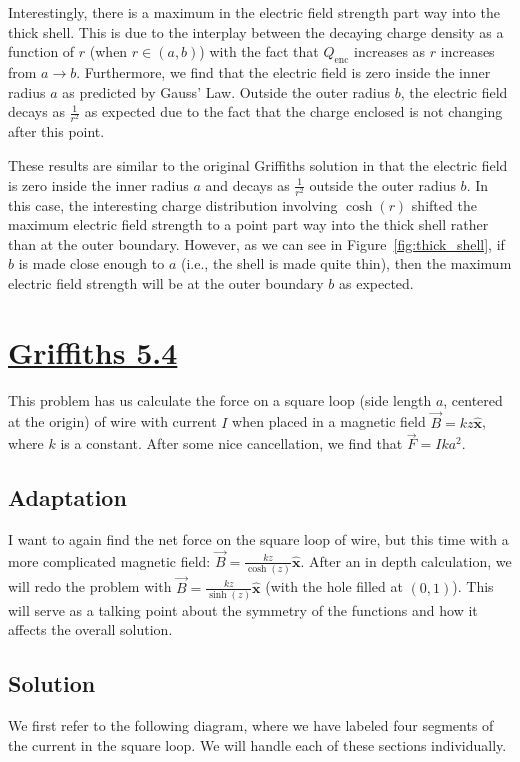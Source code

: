 \documentclass{article}
\newcommand{\xhat}{\hat{\textbf{x}}}
\begin{document}
Interestingly, there is a maximum in the electric field strength part way into the thick shell. This is due to the interplay between the decaying charge density as a function of $r$ (when $r\in(a,b)$) with the fact that $Q_\textrm{enc}$ increases as $r$ increases from $a\to b$. Furthermore, we find that the electric field is zero inside the inner radius $a$ as predicted by Gauss' Law. Outside the outer radius $b$, the electric field decays as $\frac{1}{r^2}$ as expected due to the fact that the charge enclosed is not changing after this point.

These results are similar to the original Griffiths solution in that the electric field is zero inside the inner radius $a$ and decays as $\frac{1}{r^2}$ outside the outer radius $b$. In this case, the interesting charge distribution involving $\cosh(r)$ shifted the maximum electric field strength to a point part way into the thick shell rather than at the outer boundary. However, as we can see in Figure~\ref{fig:thick_shell}, if $b$ is made close enough to $a$ (i.e., the shell is made quite thin), then the maximum electric field strength will be at the outer boundary $b$ as expected.
\clearpage

\section*{\underline{Griffiths 5.4}}
This problem has us calculate the force on a square loop (side length $a$, centered at the origin) of wire with current $I$ when placed in a magnetic field $\vec{B} = kz\xhat$, where $k$ is a constant. After some nice cancellation, we find that $\vec{F} = Ika^2$.

\subsection*{Adaptation}
I want to again find the net force on the square loop of wire, but this time with a more complicated magnetic field: $\vec{B} = \frac{kz}{\cosh(z)}\xhat$. After an in depth calculation, we will redo the problem with $\vec{B} = \frac{kz}{\sinh(z)}\xhat$ (with the hole filled at $(0,1)$). This will serve as a talking point about the symmetry of the functions and how it affects the overall solution.

\subsection*{Solution}
We first refer to the following diagram, where we have labeled four segments of the current in the square loop. We will handle each of these sections individually.
\end{document}
